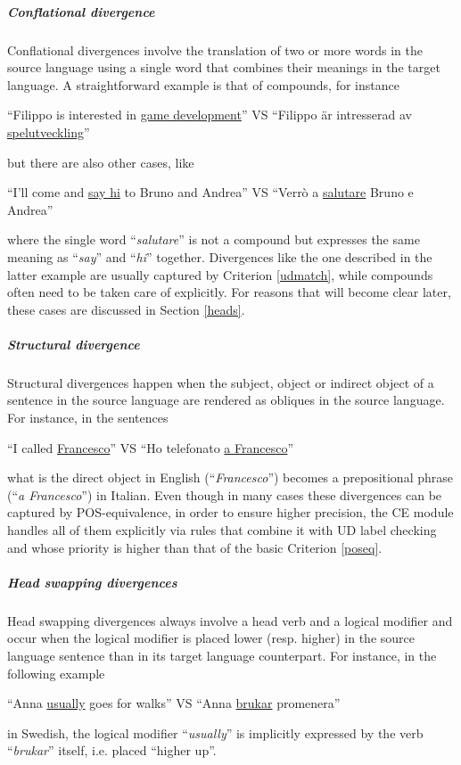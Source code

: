 \subparagraph*{Conflational divergence} \label{confl}
Conflational divergences involve the translation of two or more words in the source language using a single word that combines their meanings in the target language. A straightforward example is that of compounds, for instance
\begin{example} 
 ``Filippo is interested in \underline{game development}'' VS ``Filippo är intresserad av \underline{spelutveckling}''
\end{example}
but there are also other cases, like
\begin{example} 
 ``I'll come and \underline{say hi} to Bruno and Andrea'' VS ``Verrò a \underline{salutare} Bruno e Andrea''
\end{example} 
where the single word ``\textit{salutare}'' is not a compound but expresses the same meaning as ``\textit{say}'' and ``\textit{hi}'' together. \smallskip
Divergences like the one described in the latter example are usually captured by Criterion \ref{udmatch}, while compounds often need to be taken care of explicitly. For reasons that will become clear later, these cases are discussed in Section \ref{heads}.

\subparagraph*{Structural divergence}
Structural divergences happen when the subject, object or indirect object of a sentence in the source language are rendered as obliques in the source language. For instance, in the sentences
\begin{example}
 ``I called \underline{Francesco}'' VS ``Ho telefonato \underline{a Francesco}''
\end{example}
what is the direct object in English (``\textit{Francesco}'') becomes a prepositional phrase (``\textit{a Francesco}'') in Italian. 
Even though in many cases these divergences can be captured by POS-equivalence, in order to ensure higher precision, the CE module handles all of them explicitly via rules that combine it with UD label checking and whose priority is higher than that of the basic Criterion \ref{poseq}.

\subparagraph*{Head swapping divergences}
Head swapping divergences always involve a head verb and a logical modifier and occur when the logical modifier is placed lower (resp. higher) in the source language sentence than in its target language counterpart. For instance, in the following example
\begin{example}
 ``Anna \underline{usually} goes for walks'' VS ``Anna \underline{brukar} promenera''
\end{example} 
in Swedish, the logical modifier ``\textit{usually}'' is implicitly expressed by the verb ``\textit{brukar}'' itself, i.e. placed ``higher up''. \smallskip

